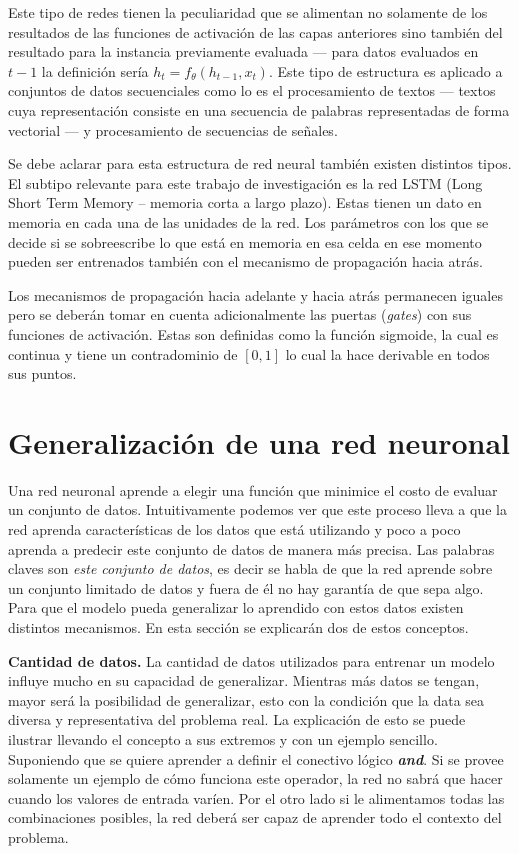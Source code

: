 

Este tipo de redes tienen la peculiaridad que se alimentan no solamente de los resultados de las funciones de activación de las capas anteriores sino también del resultado para la instancia previamente evaluada --- para datos evaluados en $t - 1$ la definición sería $h_t = f_{\theta}(h_{t-1}, x_t)$. Este tipo de estructura es aplicado a conjuntos de datos secuenciales como lo es el procesamiento de textos --- textos cuya representación consiste en una secuencia de palabras representadas de forma vectorial --- y procesamiento de secuencias de señales.

Se debe aclarar para esta estructura de red neural también existen distintos tipos. El subtipo relevante para este trabajo de investigación es la red LSTM (Long Short Term Memory -- memoria corta a largo plazo). Estas tienen un dato en memoria en cada una de las unidades de la red. Los parámetros con los que se decide si se sobreescribe lo que está en memoria en esa celda en ese momento pueden ser entrenados también con el mecanismo de propagación hacia atrás.

Los mecanismos de propagación hacia adelante y hacia atrás permanecen iguales pero se deberán tomar en cuenta adicionalmente las puertas (\textit{gates}) con sus funciones de activación. Estas son definidas como la función sigmoide, la cual es continua y tiene un contradominio de $[0,1]$ lo cual la hace derivable en todos sus puntos.

\section{Generalización de una red neuronal}

Una red neuronal aprende a elegir una función que minimice el costo de evaluar un conjunto de datos. Intuitivamente podemos ver que este proceso lleva a que la red aprenda características de los datos que está utilizando y poco a poco aprenda a predecir este conjunto de datos de manera más precisa. Las palabras claves son \textit{este conjunto de datos}, es decir se habla de que la red aprende sobre un conjunto limitado de datos y fuera de él no hay garantía de que sepa algo. Para que el modelo pueda generalizar lo aprendido con estos datos existen distintos mecanismos. En esta sección se explicarán dos de estos conceptos.

\textbf{Cantidad de datos.} La cantidad de datos utilizados para entrenar un modelo influye mucho en su capacidad de generalizar. Mientras más datos se tengan, mayor será la posibilidad de generalizar, esto con la condición que la data sea diversa y representativa del problema real. La explicación de esto se puede ilustrar llevando el concepto a sus extremos y con un ejemplo sencillo. Suponiendo que se quiere aprender a definir el conectivo lógico \textbf{\textit{and}}. Si se provee solamente un ejemplo de cómo funciona este operador, la red no sabrá que hacer cuando los valores de entrada varíen. Por el otro lado si le alimentamos todas las combinaciones posibles, la red deberá ser capaz de aprender todo el contexto del problema.

